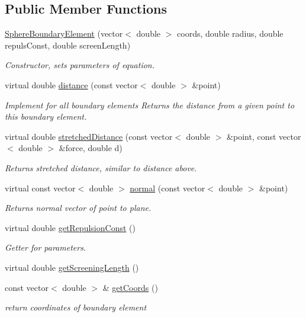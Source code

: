 \subsection*{Public Member Functions}
\begin{DoxyCompactItemize}
\item 
\hyperlink{classSphereBoundaryElement_a03cc51e8db0d5f638d772ac95720f436}{Sphere\+Boundary\+Element} (vector$<$ double $>$ coords, double radius, double repuls\+Const, double screen\+Length)
\begin{DoxyCompactList}\small\item\em Constructor, sets parameters of equation. \end{DoxyCompactList}\item 
virtual double \hyperlink{classSphereBoundaryElement_a8e28d60646f36a7ff943e69e62f248e4}{distance} (const vector$<$ double $>$ \&point)
\begin{DoxyCompactList}\small\item\em Implement for all boundary elements Returns the distance from a given point to this boundary element. \end{DoxyCompactList}\item 
virtual double \hyperlink{classSphereBoundaryElement_a41d124459d11422c46c578f70d1af1b0}{stretched\+Distance} (const vector$<$ double $>$ \&point, const vector$<$ double $>$ \&force, double d)
\begin{DoxyCompactList}\small\item\em Returns stretched distance, similar to distance above. \end{DoxyCompactList}\item 
virtual const vector$<$ double $>$ \hyperlink{classSphereBoundaryElement_a505ad6dae8dfaff38f2b845d6f7b7ee5}{normal} (const vector$<$ double $>$ \&point)
\begin{DoxyCompactList}\small\item\em Returns normal vector of point to plane. \end{DoxyCompactList}\item 
virtual double \hyperlink{classSphereBoundaryElement_aa9b8bd814e79f335232d3aac100148a0}{get\+Repulsion\+Const} ()
\begin{DoxyCompactList}\small\item\em Getter for parameters. \end{DoxyCompactList}\item 
virtual double \hyperlink{classSphereBoundaryElement_aacda85af577d438ce939274960d72045}{get\+Screening\+Length} ()
\item 
const vector$<$ double $>$ \& \hyperlink{classBoundaryElement_ace76817d750bb44c11edd918f1a8b78f}{get\+Coords} ()
\begin{DoxyCompactList}\small\item\em return coordinates of boundary element \end{DoxyCompactList}\end{DoxyCompactItemize}
